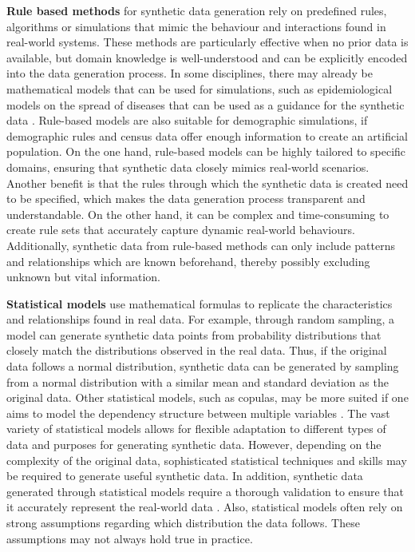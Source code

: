 \textbf{Rule based methods} for synthetic data generation rely on predefined rules, algorithms or simulations that mimic the behaviour and interactions found in real-world systems. These methods are particularly effective when no prior data is available, but domain knowledge is well-understood and can be explicitly encoded into the data generation process. In some disciplines, there may already be mathematical models that can be used for simulations, such as epidemiological models on the spread of diseases that can be used as a guidance for the synthetic data \cite{ajelli2018rapidd,gonzales2023synthetic}. Rule-based models are also suitable for demographic simulations, if demographic rules and census data offer enough information to create an artificial population. On the one hand, rule-based models can be highly tailored to specific domains, ensuring that synthetic data closely mimics real-world scenarios. Another benefit is that the rules through which the synthetic data is created need to be specified, which makes the data generation process transparent and understandable. On the other hand, it can be complex and time-consuming to create rule sets that accurately capture dynamic real-world behaviours. Additionally, synthetic data from rule-based methods can only include patterns and relationships which are known beforehand, thereby possibly excluding unknown but vital information. 

\textbf{Statistical models} use mathematical formulas to replicate the characteristics and relationships found in real data. For example, through random sampling, a model can generate synthetic data points from probability distributions that closely match the distributions observed in the real data. Thus, if the original data follows a normal distribution, synthetic data can be generated by sampling from a normal distribution with a similar mean and standard deviation as the original data. Other statistical models, such as copulas, may be more suited if one aims to model the dependency structure between multiple variables \cite{kamthe2021copula}. The vast variety of statistical models allows for flexible adaptation to different types of data and purposes for generating synthetic data. However, depending on the complexity of the original data, sophisticated statistical techniques and skills may be required to generate useful synthetic data. In addition, synthetic data generated through statistical models require a thorough validation to ensure that it accurately represent the real-world data \cite{pezoulas2024synthetic}. Also, statistical models often rely on strong assumptions regarding which distribution the data follows. These assumptions may not always hold true in practice. 

